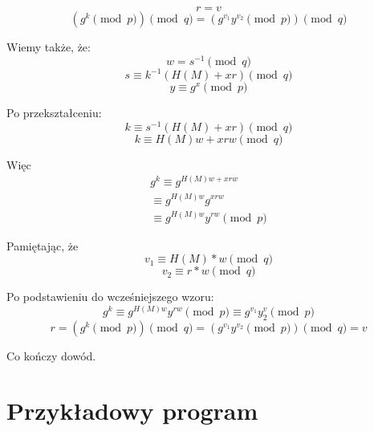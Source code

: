 \documentclass[11pt]{article}
\begin{document}
\begin{equation*}
  r = v
\end{equation*}
\begin{equation*}
  (g^{k} \pmod p) \pmod q = (g^{v_{1}}y^{v_{2}} \pmod p) \pmod q
\end{equation*}

Wiemy także, że:
\begin{equation*}
  w = s^{-1} \pmod q
\end{equation*}
\begin{equation*}
  s \equiv k^{-1}(H(M) + xr) \pmod q
\end{equation*}
\begin{equation*}
  y \equiv g^{x} \pmod p
\end{equation*}

Po przekształceniu:
\begin{equation*}
  k \equiv s^{-1}(H(M) + xr) \pmod q
\end{equation*}
\begin{equation*}
  k \equiv H(M)w + xrw \pmod q
\end{equation*}

Więc
\begin{equation*}
  \begin{aligned}
    g^{k} \equiv g^{H(M)w + xrw} \\ \equiv g^{H(M)w} g^{xrw} \\ \equiv g^{H(M)w} y^{rw} \pmod p
  \end{aligned}
\end{equation*}

Pamiętając, że
\begin{equation*}
  v_{1} \equiv H(M) * w \pmod q
\end{equation*}
\begin{equation*}
  v_{2} \equiv r * w \pmod q
\end{equation*}

Po podstawieniu do wcześniejszego wzoru:
\begin{equation*}
    g^{k} \equiv g^{H(M)w} y^{rw} \pmod p \equiv g^{v_1}y^v_2 \pmod p
\end{equation*}
\begin{equation*}
    r = (g^{k} \pmod p) \pmod q = (g^{v_{1}}y^{v_{2}} \pmod p) \pmod q = v
\end{equation*}

Co kończy dowód.

\pagebreak

\section{Przykładowy program}
\end{document}
